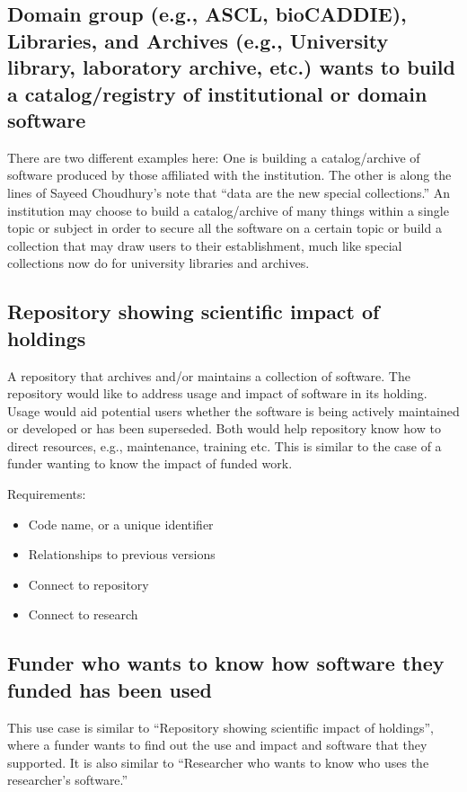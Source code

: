 \documentclass[12pt, oneside]{amsart}
\begin{document}
\subsection{Domain group (e.g., ASCL, bioCADDIE), Libraries, and Archives (e.g., University library, laboratory archive, etc.) wants to build a catalog\slash registry of institutional or domain software}

There are two different examples here: One is building a catalog/archive of software produced by those affiliated with the institution.
The other is along the lines of Sayeed Choudhury's note that ``data are the new special collections.''
An institution may choose to build a catalog/archive of many things within a single topic or subject in order to secure all the software on a certain topic or build a collection that may draw users to their establishment, much like special collections now do for university libraries and archives.

\subsection{Repository showing scientific impact of holdings}

A repository that archives and/or maintains a collection of software.
The repository would like to address usage and impact of software in its holding.
Usage would aid potential users whether the software is being actively maintained or developed or has been superseded.
Both would help repository know how to direct resources, e.g., maintenance, training etc.
This is similar to the case of a funder wanting to know the impact of funded work.

Requirements:
\begin{itemize}
\item Code name, or a unique identifier
\item Relationships to previous versions
\item Connect to repository
\item Connect to research
\end{itemize}

\subsection{Funder who wants to know how software they funded has been used}

This use case is similar to ``Repository showing scientific impact of holdings'',
where a funder wants to find out the use and impact and software that they
supported.  It is also similar to ``Researcher who wants to know who uses the researcher's software.''
\end{document}
